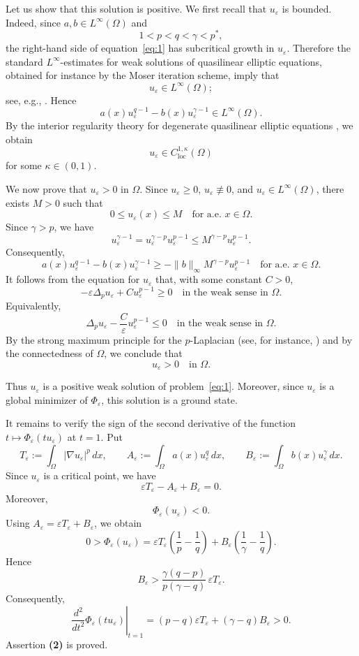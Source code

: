 \documentclass[preprint,11pt]{elsarticle}
\numberwithin{equation}{section}
\begin{document}
Let us show that this solution is positive. We first recall that
\(u_\varepsilon\) is bounded. Indeed, since \(a,b\in L^\infty(\Omega)\) and
\[
1<p<q<\gamma<p^*,
\]
the right-hand side of equation~\eqref{eq:1} has subcritical growth in
\(u_\varepsilon\). Therefore the standard \(L^\infty\)-estimates for weak
solutions of quasilinear elliptic equations, obtained for instance by the
Moser iteration scheme, imply that
\[
u_\varepsilon\in L^\infty(\Omega);
\]
see, e.g., \cite{DrabekKufnerNicolosi1997}. Hence
\[
a(x)u_\varepsilon^{q-1}
-
b(x)u_\varepsilon^{\gamma-1}
\in L^\infty(\Omega).
\]
By the interior regularity theory for degenerate quasilinear elliptic
equations \cite{DiBened,Tolksdorf}, we obtain
\[
u_\varepsilon\in C^{1,\kappa}_{\mathrm{loc}}(\Omega)
\]
for some \(\kappa\in(0,1)\).

We now prove that \(u_\varepsilon>0\) in \(\Omega\). Since
\(u_\varepsilon\ge0\), \(u_\varepsilon\not\equiv0\), and
\(u_\varepsilon\in L^\infty(\Omega)\), there exists \(M>0\) such that
\[
0\le u_\varepsilon(x)\le M
\quad\text{for a.e. }x\in\Omega .
\]
Since \(\gamma>p\), we have
\[
u_\varepsilon^{\gamma-1}
=
u_\varepsilon^{\gamma-p}u_\varepsilon^{p-1}
\le
M^{\gamma-p}u_\varepsilon^{p-1}.
\]
Consequently,
\[
a(x)u_\varepsilon^{q-1}
-
b(x)u_\varepsilon^{\gamma-1}
\ge
-\|b\|_\infty M^{\gamma-p}u_\varepsilon^{p-1}
\quad\text{for a.e. }x\in\Omega .
\]
It follows from the equation for \(u_\varepsilon\) that, with some constant
\(C>0\),
\[
-\varepsilon\Delta_p u_\varepsilon
+
C u_\varepsilon^{p-1}
\ge0
\quad\text{in the weak sense in }\Omega .
\]
Equivalently,
\[
\Delta_p u_\varepsilon
-
\frac{C}{\varepsilon}u_\varepsilon^{p-1}
\le0
\quad\text{in the weak sense in }\Omega .
\]
By the strong maximum principle for the \(p\)-Laplacian
(see, for instance, \cite{Vazquez1984}) and by the connectedness of
\(\Omega\), we conclude that
\[
u_\varepsilon>0
\quad\text{in }\Omega .
\]

Thus \(u_\varepsilon\) is a positive weak solution of problem~\eqref{eq:1}.
Moreover, since \(u_\varepsilon\) is a global minimizer of
\(\Phi_\varepsilon\), this solution is a ground state.

It remains to verify the sign of the second derivative of the function
\(t\mapsto\Phi_\varepsilon(tu_\varepsilon)\) at \(t=1\). Put
\[
T_\varepsilon:=\int_\Omega |\nabla u_\varepsilon|^p\,dx,
\qquad
A_\varepsilon:=\int_\Omega a(x)u_\varepsilon^q\,dx,
\qquad
B_\varepsilon:=\int_\Omega b(x)u_\varepsilon^\gamma\,dx .
\]
Since \(u_\varepsilon\) is a critical point, we have
\[
\varepsilon T_\varepsilon-A_\varepsilon+B_\varepsilon=0.
\]
Moreover,
\[
\Phi_\varepsilon(u_\varepsilon)<0 .
\]
Using \(A_\varepsilon=\varepsilon T_\varepsilon+B_\varepsilon\), we obtain
\[
0>
\Phi_\varepsilon(u_\varepsilon)
=
\varepsilon T_\varepsilon\left(\frac1p-\frac1q\right)
+
B_\varepsilon\left(\frac1\gamma-\frac1q\right).
\]
Hence
\[
B_\varepsilon>
\frac{\gamma(q-p)}{p(\gamma-q)}\,\varepsilon T_\varepsilon .
\]
Consequently,
\[
\left.\frac{d^2}{dt^2}\Phi_\varepsilon(tu_\varepsilon)\right|_{t=1}
=
(p-q)\varepsilon T_\varepsilon+(\gamma-q)B_\varepsilon
>
0 .
\]
Assertion \textbf{(2)} is proved.
\end{document}
